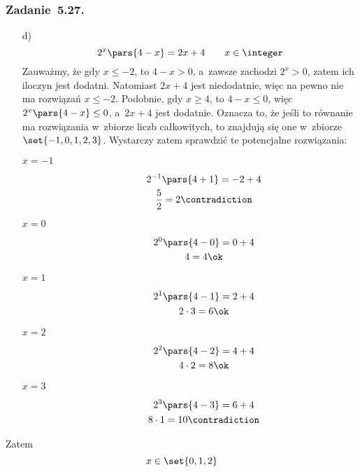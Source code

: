 \subsubsection*{Zadanie~5.27.}
\begin{itemize}
    \item[d)]
        \begin{equation*}
            2^x\pars{4 - x} = 2x + 4 \qquad x \in \integer
        \end{equation*}
        Zauważmy, że gdy \(x \leq -2\), to \(4 - x > 0\), a~zawsze zachodzi \(2^x > 0\), zatem ich iloczyn jest dodatni. Natomiast \(2x + 4\) jest niedodatnie, więc na pewno nie ma rozwiązań \(x \leq -2\). Podobnie, gdy \(x \geq 4\), to \(4 - x \leq 0\), więc \(2^x\pars{4 - x} \leq 0\), a~\(2x + 4\) jest dodatnie. Oznacza to, że jeśli to równanie ma rozwiązania w~zbiorze liczb całkowitych, to znajdują się one w~zbiorze \(\set{-1, 0, 1, 2, 3}\). Wystarczy zatem sprawdzić te potencjalne rozwiązania:
            \begin{description}
                \item[\(x = -1\)]
                    \begin{gather*}
                        2^{-1}\pars{4 + 1} = -2 + 4\\
                        \frac{5}{2} = 2 \contradiction
                    \end{gather*}
                \item[\(x = 0\)]
                    \begin{gather*}
                        2^0\pars{4 - 0} = 0 + 4\\
                        4 = 4 \ok
                    \end{gather*}
                \item[\(x = 1\)]
                    \begin{gather*}
                        2^1\pars{4 - 1} = 2 + 4\\
                        2 \cdot 3 = 6 \ok
                    \end{gather*}
                \item[\(x = 2\)]
                    \begin{gather*}
                        2^2\pars{4 - 2} = 4 + 4\\
                        4 \cdot 2 = 8 \ok
                    \end{gather*}
                \item[\(x = 3\)]
                    \begin{gather*}
                        2^3\pars{4 - 3} = 6 + 4\\
                        8 \cdot 1 = 10 \contradiction
                    \end{gather*}
            \end{description}
\end{itemize}
Zatem
\begin{equation*}
    x \in \set{0, 1, 2}
\end{equation*}
